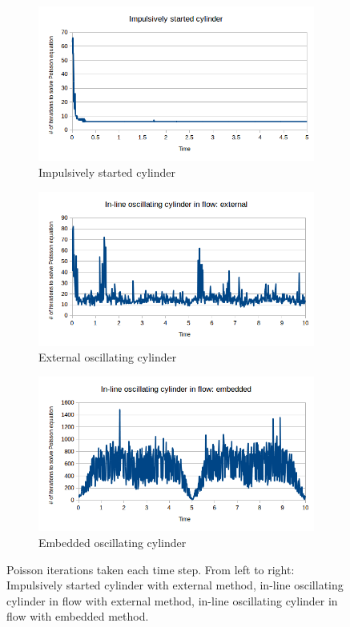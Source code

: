 \begin{figure}[!htb]
	\centering
	\begin{subfigure}{0.6\textwidth}
		\includegraphics[width=\linewidth]{cy_iter}
		\caption{Impulsively started cylinder}
	\end{subfigure}
	
	\begin{subfigure}{0.6\textwidth}
		\includegraphics[width=\linewidth]{ex_iter}
		\caption{External oscillating cylinder}
	\end{subfigure}
	
	\begin{subfigure}{0.6\textwidth}
		\includegraphics[width=\linewidth]{em_iter}
		\caption{Embedded oscillating cylinder}
	\end{subfigure}
	\caption{Poisson iterations taken each time step. From left to right: Impulsively started cylinder with external method, in-line oscillating cylinder in flow with external method, in-line oscillating cylinder in flow with embedded method.}
	\label{fig:iter}
\end{figure}


